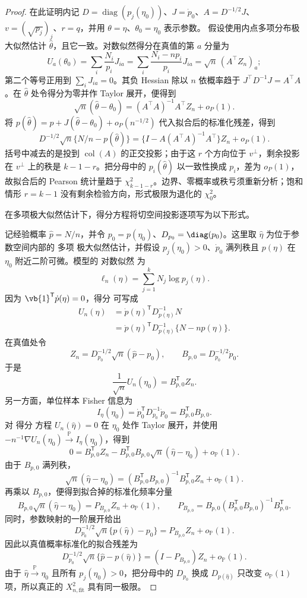 \begin{proof}
在此证明内记 $D=\operatorname{diag}(p_j(\eta_0))$、$J=\dot p_0$、$A=D^{-1/2}J$、
$v=(\sqrt{p_j})_j$、$r=q$，并用 $\theta=\eta$、$\theta_0=\eta_0$ 表示参数。
假设使用内点多项分布极大似然估计 \(\widehat\theta\)，且它一致。对数似然得分在真值的第 \(a\) 分量为
\[
U_a(\theta_0)
=\sum_i\frac{N_i}{p_i}J_{ia}
=\sum_i\frac{N_i-np_i}{p_i}J_{ia}
=\sqrt n\,(A^\top Z_n)_a;
\]
第二个等号正用到 \(\sum_iJ_{ia}=0\)。其负 Hessian 除以 \(n\) 依概率趋于
\(J^\top D^{-1}J=A^\top A\)。在 \(\widehat\theta\) 处令得分为零并作 Taylor 展开，便得到
\[
\sqrt n(\widehat\theta-\theta_0)
=(A^\top A)^{-1}A^\top Z_n+o_P(1).
\]
将 \(p(\widehat\theta)=p+J(\widehat\theta-\theta_0)+o_P(n^{-1/2})\)
代入拟合后的标准化残差，得到
\[
D^{-1/2}\sqrt n\{N/n-p(\widehat\theta)\}
=\{I-A(A^\top A)^{-1}A^\top\}Z_n+o_P(1).
\]
括号中减去的是投到 \(\operatorname{col}(A)\) 的正交投影；由于这 \(r\) 个方向位于 \(v^\perp\)，剩余投影在 \(v^\perp\) 上的秩是 \(k-1-r\)。把分母中的 \(p_i(\widehat\theta)\) 以一致性换成 \(p_i\)，差为 \(o_P(1)\)，故拟合后的 Pearson 统计量趋于
\(\chi^2_{k-1-r}\)。边界、零概率或秩亏须重新分析；饱和情形 \(r=k-1\) 没有剩余检验方向，形式极限为退化的 \(\chi^2_0\)。

在多项极大似然估计下，得分方程将切空间投影逐项写为以下形式。

记经验概率 $\widehat p=N/n$，并令 $p_0=p(\eta_0)$、$D_{p_0}=\diag(p_0)$。这里取 $\widehat\eta$ 为位于参数空间内部的 多项 极大似然估计，并假设 $p_j(\eta_0)>0$、$\dot p_0$ 满列秩且 $p(\eta)$ 在 $\eta_0$ 附近二阶可微。模型的 对数似然 为
\[
 \ell_n(\eta)=\sum_{j=1}^kN_j\log p_j(\eta).
\]
因为 $\vb{1}^{\mathsf T}\dot p(\eta)=0$，得分 可写成
\begin{align*}
 U_n(\eta)
 &=\dot p(\eta)^{\mathsf T}
 D_{p(\eta)}^{-1}N\\
 &=\dot p(\eta)^{\mathsf T}
 D_{p(\eta)}^{-1}
 \{N-np(\eta)\}.
\end{align*}
在真值处令
\[
 Z_n=D_{p_0}^{-1/2}\sqrt n(\widehat p-p_0),
 \qquad
 B_{p,0}=D_{p_0}^{-1/2}\dot p_0.
\]
于是
\[
 \frac1{\sqrt n}U_n(\eta_0)
 =B_{p,0}^{\mathsf T}Z_n.
\]
另一方面，单位样本 Fisher 信息为
\[
 I_\eta(\eta_0)
 =\dot p_0^{\mathsf T}D_{p_0}^{-1}\dot p_0
 =B_{p,0}^{\mathsf T}B_{p,0}.
\]
对 得分 方程 $U_n(\widehat\eta)=0$ 在 $\eta_0$ 处作 Taylor 展开，并使用 $-n^{-1}\nabla U_n(\eta_0)\xrightarrow{\mathbb P} I_\eta(\eta_0)$，得到
\[
 0
 =B_{p,0}^{\mathsf T}Z_n
 -B_{p,0}^{\mathsf T}B_{p,0}
 \sqrt n(\widehat\eta-\eta_0)
 +o_{\mathbb P}(1).
\]
由于 $B_{p,0}$ 满列秩，
\[
 \sqrt n(\widehat\eta-\eta_0)
 =(B_{p,0}^{\mathsf T}B_{p,0})^{-1}B_{p,0}^{\mathsf T}Z_n
 +o_{\mathbb P}(1).
\]
再乘以 $B_{p,0}$，便得到拟合掉的标准化频率分量
\[
 B_{p,0}\sqrt n(\widehat\eta-\eta_0)
 =P_{B_{p,0}}Z_n+o_{\mathbb P}(1),
 \qquad
 P_{B_{p,0}}
 =B_{p,0}(B_{p,0}^{\mathsf T}B_{p,0})^{-1}B_{p,0}^{\mathsf T}.
\]
同时，参数映射的一阶展开给出
\[
 D_{p_0}^{-1/2}\sqrt n
 \{p(\widehat\eta)-p_0\}
 =P_{B_{p,0}}Z_n+o_{\mathbb P}(1).
\]
因此以真值概率标准化的拟合残差为
\[
 D_{p_0}^{-1/2}\sqrt n
 \{\widehat p-p(\widehat\eta)\}
 =(I-P_{B_{p,0}})Z_n+o_{\mathbb P}(1).
\]
由于 $\widehat\eta\xrightarrow{\mathbb P}\eta_0$ 且所有 $p_j(\eta_0)>0$，把分母中的 $D_{p_0}$ 换成 $D_{p(\widehat\eta)}$ 只改变 $o_{\mathbb P}(1)$ 项，所以真正的 $X_{n,\mathrm{fit}}^2$ 具有同一极限。


\end{proof}
